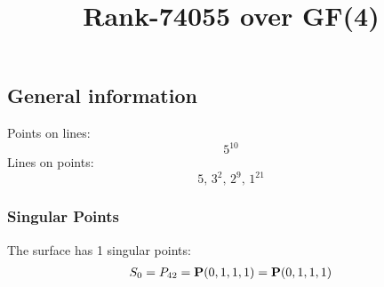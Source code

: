 \documentclass{article}
\newcommand\setTBstruts{\def\T{\rule{0pt}{2.6ex}}%
\def\B{\rule[-1.2ex]{0pt}{0pt}}}
\newcommand{\bP}{{\bf P}}
\begin{document}
 
\setTBstruts



{\allowdisplaybreaks%






\title{Rank-74055 over GF(4)}
\author{}%
\maketitle%
%
{}



\subsection*{General information}
Points on lines:
$$
5^{10}$$
Lines on points:
$$
5,\,3^2,\,2^9,\,1^{21}$$
\subsubsection*{Singular Points}
The surface has 1 singular points:\\
\begin{align*}
S_{0} &= P_{42}=\bP(0, 1, 1, 1) = \bP(0, 1, 1, 1)\\
\end{align*}
}
\end{document}
